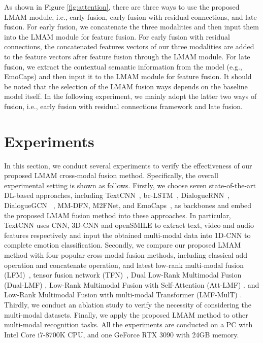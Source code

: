 {{As shown in Figure \ref{fig:attention}, there are three ways to use the proposed LMAM module, i.e., early fusion, early fusion with residual connections, and late fusion. For early fusion, we concatenate the three modalities and then input them into the LMAM module for feature fusion. For early fusion with residual connections, the concatenated features vectors of our three modalities are added to the feature vectors after feature fusion through the LMAM module. For late fusion, we extract the contextual semantic information from the model (e.g., EmoCaps) and then input it to the LMAM module for feature fusion.
It should be noted that the selection of the LMAM fusion ways depends on the baseline model itself. In the following experiment, we mainly adopt the latter two ways of fusion, i.e., early fusion with residual connections framework and late fusion.

\section{Experiments}
In this section, we conduct several experiments to verify the effectiveness of our proposed LMAM cross-modal fusion method. Specifically, the overall experimental setting is shown as follows. Firstly, we choose seven state-of-the-art DL-based approaches, including TextCNN~\cite{2014Convolutional}, bc-LSTM~\cite{poria2017context}, DialogueRNN~\cite{majumder2019dialoguernn}, DialogueGCN ~\cite{ghosal2019dialoguegcn}, MM-DFN\cite{hu2022mm}, M2FNet\cite{chudasama2022m2fnet}, and EmoCaps~\cite{li2022emocaps}, as backbones and embed the proposed LMAM fusion method into these approaches. {In particular, TextCNN uses CNN, 3D-CNN and openSMILE to extract text, video and audio features respectively and input the obtained multi-modal data into 1D-CNN to complete emotion classification.} Secondly, we compare our proposed LMAM method with four popular cross-modal fusion methods, including classical add operation and concatenate operation, and latest low-rank multi-modal fusion (LFM)~\cite{Liu2018EfficientLM}, tensor fusion network (TFN)~\cite{zadeh2017tensor}, {Dual Low-Rank Multimodal Fusion (Dual-LMF) \cite{jin-etal-2020-dual}, Low-Rank Multimodal Fusion with Self-Attention (Att-LMF) \cite{zhu2020multimodal}. and Low-Rank Multimodal Fusion with multi-modal Transformer (LMF-MulT) \cite{sahay2020low}.} Thirdly, we conduct an ablation study to verify the necessity of considering the multi-modal datasets. Finally, we apply the proposed LMAM method to other multi-modal recognition tasks. All the experiments are conducted on a PC with Intel Core i7-8700K CPU, and one GeForce RTX 3090 with 24GB memory.

}}
